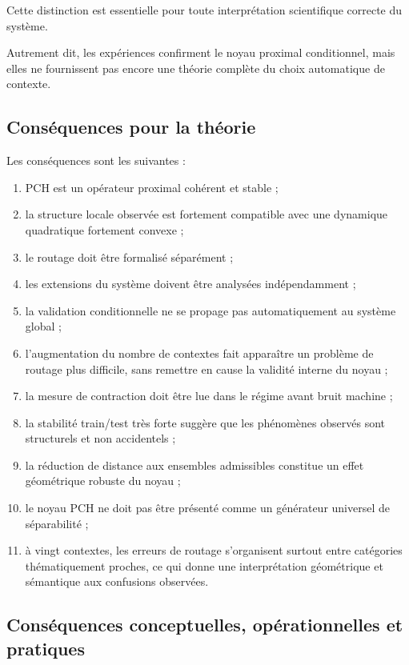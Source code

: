 \documentclass[11pt,a4paper]{article}
\newcommand{\1}{\mathbf 1}
\begin{document}
Cette distinction est essentielle pour toute interprétation scientifique correcte du système.

Autrement dit, les expériences confirment le noyau proximal conditionnel, mais elles ne fournissent pas encore une théorie complète du choix automatique de contexte.

\subsection{Conséquences pour la théorie}

Les conséquences sont les suivantes :

\begin{enumerate}[leftmargin=2em]
\item PCH est un opérateur proximal cohérent et stable ;
\item la structure locale observée est fortement compatible avec une dynamique quadratique fortement convexe ;
\item le routage doit être formalisé séparément ;
\item les extensions du système doivent être analysées indépendamment ;
\item la validation conditionnelle ne se propage pas automatiquement au système global ;
\item l’augmentation du nombre de contextes fait apparaître un problème de routage plus difficile, sans remettre en cause la validité interne du noyau ;
\item la mesure de contraction doit être lue dans le régime avant bruit machine ;
\item la stabilité train/test très forte suggère que les phénomènes observés sont structurels et non accidentels ;
\item la réduction de distance aux ensembles admissibles constitue un effet géométrique robuste du noyau ;
\item le noyau PCH ne doit pas être présenté comme un générateur universel de séparabilité ;
\item à vingt contextes, les erreurs de routage s’organisent surtout entre catégories thématiquement proches, ce qui donne une interprétation géométrique et sémantique aux confusions observées.
\end{enumerate}

\subsection{Conséquences conceptuelles, opérationnelles et pratiques}
\end{document}
